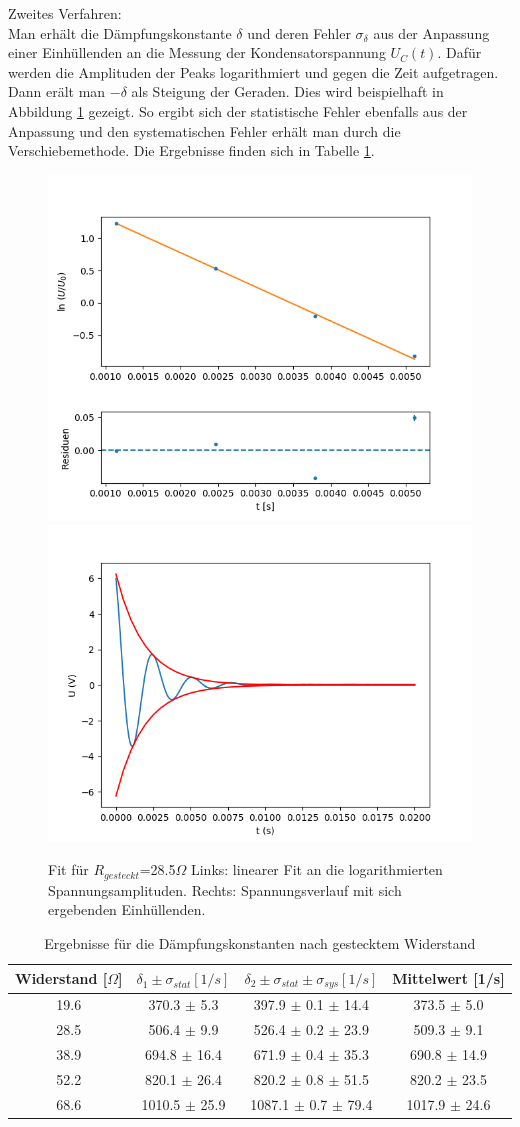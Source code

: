 \documentclass[12pt,a4paper]{article}
\begin{document}
Zweites Verfahren:\\
Man erhält die Dämpfungskonstante $\delta$ und deren Fehler $\sigma_\delta$ aus der Anpassung einer Einhüllenden an die Messung der Kondensatorspannung $U_C(t)$. Dafür werden die Amplituden der Peaks logarithmiert und gegen die Zeit aufgetragen. Dann erält man $-\delta$ als Steigung der Geraden. Dies wird beispielhaft in Abbildung \ref{pic:delta_fit} gezeigt. So ergibt sich der statistische Fehler ebenfalls aus der Anpassung und den systematischen Fehler erhält man durch die Verschiebemethode.  Die Ergebnisse finden sich in Tabelle \ref{tab:delta}.
\begin{figure}
	\centering
	\includegraphics[width=0.48\linewidth]{Bilder/28,5Ohm_lin_fit}
	\includegraphics[width=0.48\linewidth]{Bilder/28,5Ohm_exp_fit}
	\caption{Fit für $R_{gesteckt}$=28.5$\Omega$ \qquad Links: linearer Fit an die logarithmierten Spannungsamplituden. \qquad Rechts: Spannungsverlauf mit sich ergebenden Einhüllenden.}
	\label{pic:delta_fit}
\end{figure}
\begin{table}
	\centering
	\begin{tabular}{|c|c|c|c|}
		\hline
		\textbf{Widerstand [$\Omega$]} & \textbf{$\delta_1 \pm \sigma_{stat} [1/s]$} & \textbf{$\delta_2 \pm \sigma_{stat} \pm \sigma_{sys} [1/s]$} & \textbf{Mittelwert [1/s]} \\
		\hline
		19.6 & 370.3 $\pm$ 5.3 & 397.9 $\pm$ 0.1 $\pm$ 14.4 & 373.5 $\pm$ 5.0 \\
		\hline
		28.5 & 506.4 $\pm$ 9.9 & 526.4 $\pm$ 0.2 $\pm$ 23.9 & 509.3 $\pm$ 9.1 \\
		\hline
		38.9 & 694.8 $\pm$ 16.4 & 671.9 $\pm$ 0.4 $\pm$ 35.3 & 690.8 $\pm$ 14.9 \\
		\hline
		52.2 & 820.1 $\pm$ 26.4 & 820.2 $\pm$ 0.8 $\pm$ 51.5 & 820.2 $\pm$ 23.5 \\
		\hline
		68.6 & 1010.5 $\pm$ 25.9 & 1087.1 $\pm$ 0.7 $\pm$ 79.4 & 1017.9 $\pm$ 24.6 \\
		\hline
	\end{tabular}
	\caption{Ergebnisse für die Dämpfungskonstanten nach gestecktem Widerstand}
	\label{tab:delta}
\end{table}
\end{document}
